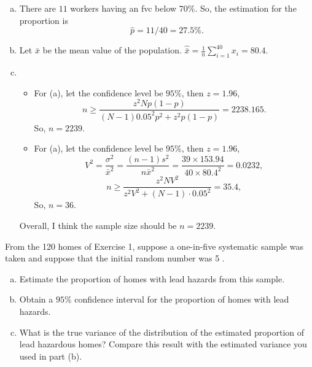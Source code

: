 \documentclass[12pt]{article}
\begin{document}
    \begin{solution}
        \begin{enumerate}[(a)]
            \item There are $11$ workers  having an fvc below $70\%$. So, the estimation for the proportion is 
            \[
                \hat{p}=11/40=27.5\%.
            \]
            \item Let $\bar{x}$ be the mean value of the population. $\hat{\bar{x}}=\frac{1}{n}\sum_{i=1}^{40}x_i=80.4$. 
            
            \item \begin{itemize}
                \item For (a), let the confidence level be $95\%$, then $z=1.96$, 
                \[
                    n\geqslant\frac{z^2Np(1-p)}{(N-1)0.05^2p^2+z^2p(1-p)}=2238.165. 
                \]
                So, $n=2239$. 
                \item For (a), let the confidence level be $95\%$, then $z=1.96$, 
                \[
                    V^2=\frac{\sigma^2}{\bar{x}^2}=\frac{(n-1)s^2}{n\bar{x}^2}=\frac{39\times153.94}{40\times80.4^2}=0.0232, 
                \]
                \[
                    n\geqslant\frac{z^2NV^2}{z^2V^2+(N-1)\cdot 0.05^2}=35.4, 
                \]
                So, $n=36$. 
            \end{itemize}
            Overall, I think the sample size should be $n=2239$. 
        \end{enumerate}
        
    \end{solution}

    \begin{exercise}[Levy-4.2(a-c)]
        From the 120 homes of Exercise 1, suppose a one-in-five systematic sample was taken and suppose that the initial random number was 5 .
        \begin{enumerate}[a.]
            \item Estimate the proportion of homes with lead hazards from this sample.
            \item Obtain a \(95 \%\) confidence interval for the proportion of homes with lead hazards.
            \item What is the true variance of the distribution of the estimated proportion of lead hazardous homes? Compare this result with the estimated variance you used in part (b).
        \end{enumerate}
    \end{exercise}
\end{document}
